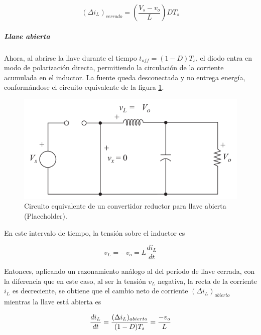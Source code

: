 \begin{equation}\label{deltaiL_cerrada}
    \boxed{
        (\Delta i_L)_{cerrado} = \left(\frac{V_s - v_o}{L}\right)DT_s
    }
\end{equation}

\subparagraph{Llave abierta}

Ahora, al abrirse la llave durante el tiempo $t_{off} = (1-D)T_s$, el diodo entra en modo de polarización directa, permitiendo la circulación de la corriente acumulada en el inductor. La fuente queda desconectada y no entrega energía, conformándose el circuito equivalente de la figura \ref{reductor_llave_abierta}.

\begin{figure}[H]
    \centering
    \includegraphics[scale=0.4]{Imagenes/Reductor Llave Abierta.png}
    \caption{Circuito equivalente de un convertidor reductor para llave abierta (Placeholder).}
    \label{reductor_llave_abierta}
\end{figure}

En este intervalo de tiempo, la tensión sobre el inductor es

\begin{equation}\label{ec_tensionL_abierta}
    v_L = -v_o = L\frac{di_L}{dt}
\end{equation}

Entonces, aplicando un razonamiento análogo al del período de llave cerrada, con la diferencia que en este caso, al ser la tensión $v_L$ negativa, la recta de la corriente $i_L$ es decreciente, se obtiene que el cambio neto de corriente $(\Delta i_L)_{abierto}$ mientras la llave está abierta es

\begin{equation*}
    \frac{di_L}{dt} = \frac{(\Delta i_L)_{abierto}}{(1-D)T_s} = \frac{-v_o}{L}\\
\end{equation*}


